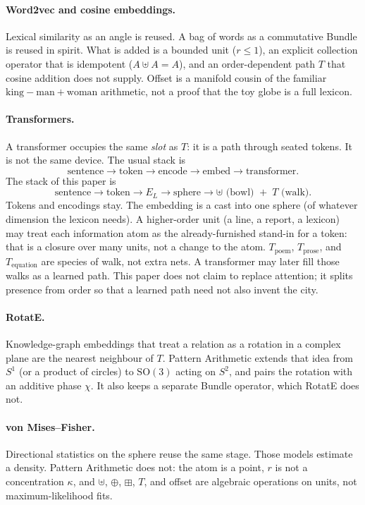 \documentclass[12pt, a4paper]{article}
\begin{document}
\paragraph{Word2vec and cosine embeddings.}
Lexical similarity as an angle is reused. A bag of words as a
commutative Bundle is reused in spirit. What is added is a bounded unit
($r\le 1$), an explicit collection operator that is idempotent
($A\uplus A=A$), and an order-dependent path $T$ that cosine addition
does not supply. Offset is a manifold cousin of the familiar
$\mathrm{king}-\mathrm{man}+\mathrm{woman}$ arithmetic, not a proof
that the toy globe is a full lexicon.

\paragraph{Transformers.}
A transformer occupies the same \emph{slot} as $T$: it is a path
through seated tokens. It is not the same device. The usual stack is
\[
\text{sentence}\to\text{token}\to\text{encode}\to\text{embed}\to\text{transformer}.
\]
The stack of this paper is
\[
\text{sentence}\to\text{token}\to E_L\to\text{sphere}\to
\uplus\text{ (bowl) }+\; T\text{ (walk)}.
\]
Tokens and encodings stay. The embedding is a cast into one sphere
(of whatever dimension the lexicon needs). A higher-order unit (a
line, a report, a lexicon) may treat each information atom as the
already-furnished stand-in for a token: that is a closure over many
units, not a change to the atom. $T_{\mathrm{poem}}$,
$T_{\mathrm{prose}}$, and $T_{\mathrm{equation}}$ are species of
walk, not extra nets. A transformer may later fill those walks as a
learned path. This paper does not claim to replace attention; it
splits presence from order so that a learned path need not also
invent the city.

\paragraph{RotatE.}
Knowledge-graph embeddings that treat a relation as a rotation in a
complex plane are the nearest neighbour of $T$. Pattern Arithmetic
extends that idea from $S^1$ (or a product of circles) to
$\mathrm{SO}(3)$ acting on $S^2$, and pairs the rotation with an
additive phase $\chi$. It also keeps a separate Bundle operator,
which RotatE does not.

\paragraph{von Mises--Fisher.}
Directional statistics on the sphere reuse the same stage.
Those models estimate a density. Pattern Arithmetic does not: the atom
is a point, $r$ is not a concentration $\kappa$, and $\uplus$, $\oplus$, $\boxplus$, $T$, and
offset are algebraic operations on units, not maximum-likelihood fits.
\end{document}
